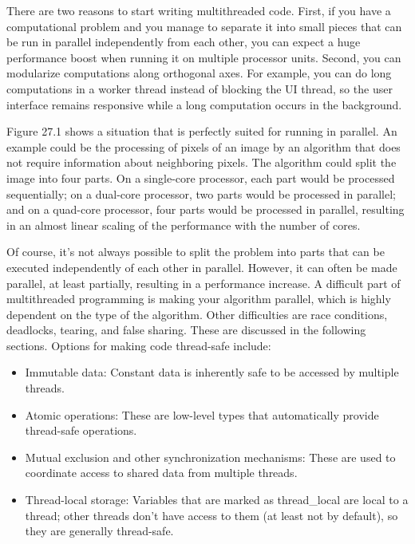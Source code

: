 There are two reasons to start writing multithreaded code. First, if you have a computational problem and you manage to separate it into small pieces that can be run in parallel independently from each other, you can expect a huge performance boost when running it on multiple processor units. Second, you can modularize computations along orthogonal axes. For example, you can do long computations in a worker thread instead of blocking the UI thread, so the user interface remains responsive while a long computation occurs in the background.

Figure 27.1 shows a situation that is perfectly suited for running in parallel. An example could be the processing of pixels of an image by an algorithm that does not require information about neighboring pixels. The algorithm could split the image into four parts. On a single-core processor, each part would be processed sequentially; on a dual-core processor, two parts would be processed in parallel; and on a quad-core processor, four parts would be processed in parallel, resulting in an almost linear scaling of the performance with the number of cores.


Of course, it’s not always possible to split the problem into parts that can be executed independently of each other in parallel. However, it can often be made parallel, at least partially, resulting in a performance increase. A difficult part of multithreaded programming is making your algorithm parallel, which is highly dependent on the type of the algorithm. Other difficulties are race conditions, deadlocks, tearing, and false sharing. These are discussed in the following sections. Options for making code thread-safe include:

\begin{itemize}
\item
Immutable data: Constant data is inherently safe to be accessed by multiple threads.

\item
Atomic operations: These are low-level types that automatically provide thread-safe operations.

\item
Mutual exclusion and other synchronization mechanisms: These are used to coordinate access to shared data from multiple threads.

\item
Thread-local storage: Variables that are marked as thread\_local are local to a thread; other threads don’t have access to them (at least not by default), so they are generally thread-safe.
\end{itemize}

